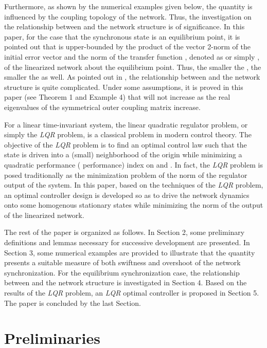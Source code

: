 \documentclass[11pt]{article}
\begin{document}
Furthermore, as shown by the numerical examples given below, the
quantity  is influenced by the coupling topology of the
network. Thus, the investigation on the relationship between
 and the network structure is of significance. In this
paper, for the case that the synchronous state is an equilibrium
point, it is pointed out that  is upper-bounded by the
product of the vector 2-norm of the initial error vector  and
the  norm of the transfer function , denoted as
 or simply , of the linearized network about
the equilibrium point. Thus, the smaller the , the smaller
the  as well. As pointed out in \cite{duan07}, the
relationship between  and the network structure is quite
complicated. Under some assumptions, it is proved in this paper (see
Theorem 1 and Example 4) that  will not increase as the
real eigenvalues of the symmetrical outer coupling matrix increase.

For a linear time-invariant system, the linear quadratic regulator
problem, or simply the \textit{LQR} problem, is a classical problem
in modern control theory. The objective of the \textit{LQR} problem
is to find an optimal control law  such that the state 
is driven into a (small) neighborhood of the origin while minimizing
a quadratic performance ( performance) index on  and . In
fact, the \textit{LQR} problem is posed traditionally as the
minimization problem of the  norm of the regulator output of
the system. In this paper, based on the techniques of the
\textit{LQR} problem, an optimal controller design is developed so
as to drive the network dynamics onto some homogenous stationary
states while minimizing the  norm of the output of the
linearized network.

The rest of the paper is organized as follows. In Section 2, some
preliminary definitions and lemmas necessary for successive
development are presented. In Section 3, some numerical examples are
provided to illustrate that the quantity  presents a
suitable measure of both swiftness and overshoot of the network
synchronization. For the equilibrium synchronization case, the
relationship between  and the network structure is
investigated in Section 4. Based on the results of the \textit{LQR}
problem, an \textit{LQR} optimal controller is proposed in Section
5. The paper is concluded by the last Section.


\section{Preliminaries}
\end{document}
